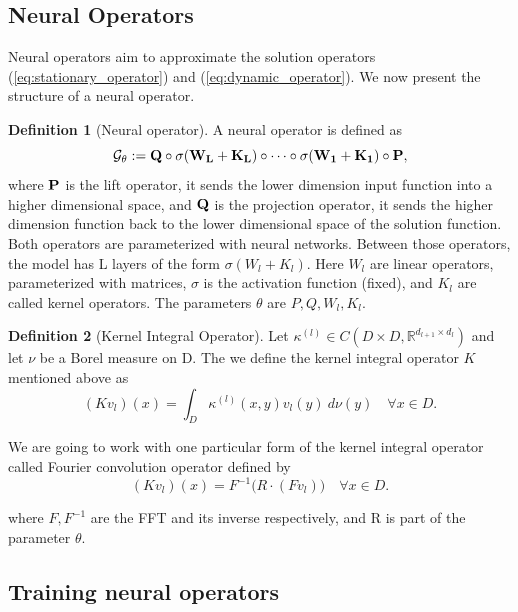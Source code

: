 \documentclass[final,1p,times]{elsarticle}
\theoremstyle{definition}
\newtheorem{defi}{Definition}
\newcommand{\R}{\mathbb{R}}
\newcommand{\Gt}{\mathcal{G}_{\theta}}
\begin{document}
\subsection{Neural Operators}

Neural operators aim to approximate the solution operators (\ref{eq:stationary_operator}) and (\ref{eq:dynamic_operator}). We now present the structure of a neural operator.
\begin{defi}[Neural operator]
    A neural operator is defined as
    \begin{equation}\label{eq:neural_operator}
        \bf \Gt := Q \circ \sigma(W_L + K_L)\circ\dots\circ\sigma(W_1 +K_1)\circ P,
    \end{equation}
    where $\bf P$ is the lift operator, it sends the lower dimension input function into a higher dimensional space, and $\bf Q$ is the projection operator, it sends the higher dimension function back to the lower dimensional space of the solution function. Both operators are parameterized with neural networks. Between those operators, the model has L layers of the form $\sigma(W_l+K_l)$. Here $W_l$ are linear operators, parameterized with matrices, $\sigma$ is the activation function (fixed), and $K_l$ are called kernel operators. The parameters $\theta$ are $P,Q,W_l,K_l$.
\end{defi}


\begin{defi}[Kernel Integral Operator]
    Let $\kappa^{(l)}\in C(D\times D,\R^{d_{l+1}\times d_l})$ and let $\nu$ be a Borel measure on D. The we define the kernel integral operator $K$ mentioned above as
    \begin{equation}
        (Kv_l)(x) = \int_D \kappa^{(l)}(x,y)v_l(y)\ d\nu(y)\quad \forall x\in D.
    \end{equation}
\end{defi}

We are going to work with one particular form of the kernel integral operator called Fourier convolution operator defined by
\begin{equation}
    (Kv_l)(x) = F^{-1}\big(R\cdot (F v_l)\big ) \quad \forall x\in D.
\end{equation}

where $F,F^{-1}$ are the FFT and its inverse respectively, and R is part of the parameter $\theta$.

\subsection{Training neural operators}
\end{document}
